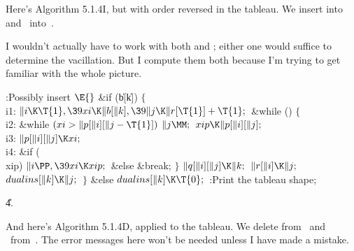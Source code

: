 Here's Algorithm 5.1.4I, but with order reversed in the %
 tableau.
We insert  into~ and ~into~.

I wouldn't actually have to work with both  and ; either one
would
suffice to determine the vacillation. But I compute them both because
I'm trying to get familiar with the whole picture.

\Y\B\4:Possibly insert \X${}\E{}$\6
\&{if} (\|b[\|k])\5
${}\{{}$\1\6
\4\\{i1}:\5
${}\|i\K\T{1},\39\\{xi}\K\|b[\|k],\39\|j\K\|r[\T{1}]+\T{1};{}$\6
\&{while} ()\5
${}\{{}$\1\6
\4\\{i2}:\5
\&{while} ${}(\\{xi}>\|p[\|i][\|j-\T{1}]){}$\1\5
${}\|j\MM;{}$\2\6
${}\\{xip}\K\|p[\|i][\|j];{}$\6
\4\\{i3}:\5
${}\|p[\|i][\|j]\K\\{xi};{}$\6
\4\\{i4}:\5
\&{if} (\\{xip})\1\5
${}\|i\PP,\39\\{xi}\K\\{xip};{}$\2\6
\&{else}\1\5
\&{break};\2\6
\4${}\}{}$\2\6
${}\|q[\|i][\|j]\K\|k;{}$\6
${}\|r[\|i]\K\|j;{}$\6
${}\\{dualins}[\|k]\K\|j;{}$\6
\4${}\}{}$\5
\2\&{else}\1\5
${}\\{dualins}[\|k]\K\T{0};{}$\2\6
:Print the tableau shape\X;\par
\U4.\fi

And here's Algorithm 5.1.4D, applied to the 
tableau.
We delete  from~ and ~from~. The error
messages
here won't be needed unless I have made a mistake.

